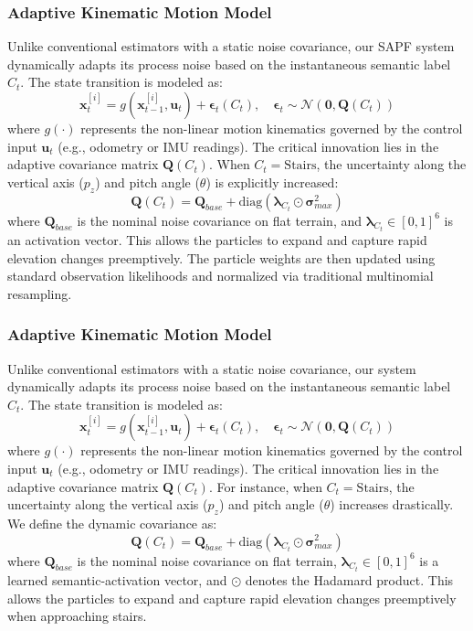\documentclass[final,3p,times]{elsarticle}
\begin{document}
\subsubsection{Adaptive Kinematic Motion Model}
Unlike conventional estimators with a static noise covariance, our SAPF system dynamically adapts its process noise based on the instantaneous semantic label $C_t$. The state transition is modeled as:
\begin{equation}
    \mathbf{x}^{[i]}_t = g(\mathbf{x}^{[i]}_{t-1}, \mathbf{u}_t) + \bm{\epsilon}_t(C_t), \quad \bm{\epsilon}_t \sim \mathcal{N}(\mathbf{0}, \mathbf{Q}(C_t))
\end{equation}
where $g(\cdot)$ represents the non-linear motion kinematics governed by the control input $\mathbf{u}_t$ (e.g., odometry or IMU readings). The critical innovation lies in the adaptive covariance matrix $\mathbf{Q}(C_t)$. When $C_t = \text{Stairs}$, the uncertainty along the vertical axis ($p_z$) and pitch angle ($\theta$) is explicitly increased:
\begin{equation}
    \mathbf{Q}(C_t) = \mathbf{Q}_{base} + \text{diag}(\bm{\lambda}_{C_t} \odot \bm{\sigma}^2_{max})
\end{equation}
where $\mathbf{Q}_{base}$ is the nominal noise covariance on flat terrain, and $\bm{\lambda}_{C_t} \in [0, 1]^6$ is an activation vector. This allows the particles to expand and capture rapid elevation changes preemptively. The particle weights are then updated using standard observation likelihoods and normalized via traditional multinomial resampling.

\subsubsection{Adaptive Kinematic Motion Model}
Unlike conventional estimators with a static noise covariance, our system dynamically adapts its process noise based on the instantaneous semantic label $C_t$. The state transition is modeled as:
\begin{equation}
    \mathbf{x}^{[i]}_t = g(\mathbf{x}^{[i]}_{t-1}, \mathbf{u}_t) + \bm{\epsilon}_t(C_t), \quad \bm{\epsilon}_t \sim \mathcal{N}(\mathbf{0}, \mathbf{Q}(C_t))
\end{equation}
where $g(\cdot)$ represents the non-linear motion kinematics governed by the control input $\mathbf{u}_t$ (e.g., odometry or IMU readings). The critical innovation lies in the adaptive covariance matrix $\mathbf{Q}(C_t)$. For instance, when $C_t = \text{Stairs}$, the uncertainty along the vertical axis ($p_z$) and pitch angle ($\theta$) increases drastically. We define the dynamic covariance as:
\begin{equation}
    \mathbf{Q}(C_t) = \mathbf{Q}_{base} + \text{diag}(\bm{\lambda}_{C_t} \odot \bm{\sigma}^2_{max})
\end{equation}
where $\mathbf{Q}_{base}$ is the nominal noise covariance on flat terrain, $\bm{\lambda}_{C_t} \in [0, 1]^6$ is a learned semantic-activation vector, and $\odot$ denotes the Hadamard product. This allows the particles to expand and capture rapid elevation changes preemptively when approaching stairs.
\end{document}
